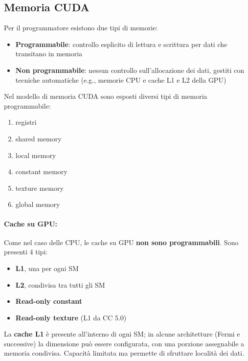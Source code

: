 \subsection{Memoria CUDA}

Per il programmatore esistono due tipi di memorie: 
\begin{itemize}
	\item \textbf{Programmabile}: controllo esplicito di lettura e scrittura per dati che transitano in memoria
	
	\item \textbf{Non programmabile}: nessun controllo sull'allocazione dei dati, gestiti con tecniche automatiche (e.g., memorie CPU e cache L1 e L2 della GPU)
\end{itemize}

Nel modello di memoria CUDA sono esposti diversi tipi di memoria programmabile: 
\begin{enumerate}
	\item registri

	\item shared memory

	\item local memory

	\item constant memory

	\item texture memory

	\item global memory
\end{enumerate}

\paragraph{Cache su GPU:} Come nel caso delle CPU, le cache su GPU \textbf{non sono programmabili}. Sono presenti 4 tipi:
\begin{itemize}
	\item \textbf{L1}, una per ogni SM
	
	\item \textbf{L2}, condivisa tra tutti gli SM
	
	\item \textbf{Read-only constant}
	
	\item \textbf{Read-only texture} (L1 da CC 5.0)
\end{itemize}

La \textbf{cache L1} è presente all'interno di ogni SM; in alcune architetture (Fermi e successive) la dimensione può essere configurata, con una porzione assegnabile a memoria condivisa. Capacità limitata ma permette di sfruttare località dei dati.

